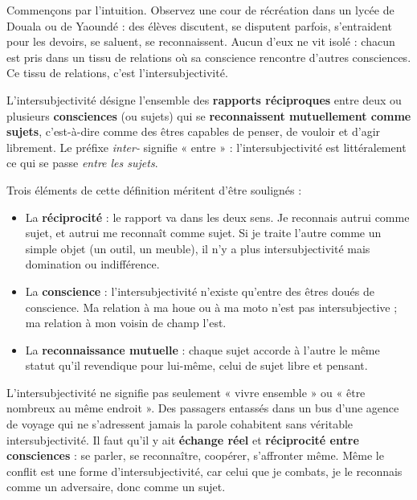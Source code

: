 \documentclass[11pt]{article}
\newcommand{\cle}[1]{{\popxbold\color{popdark}#1}}
\newcounter{popsec}
\newcounter{popsub}
\newcommand{\courssub}[1]{%
  \stepcounter{popsub}%
  \par\vspace{9pt}\noindent{\popxbold\fontsize{11.5}{13}\selectfont\color{popink}{\color{poporange}\thepopsec.\thepopsub}\hspace{6pt}#1}\par\nopagebreak\vspace{4pt}
}
\begin{document}
\courssub{Définition de l'intersubjectivité}

Commençons par l'intuition. Observez une cour de récréation dans un lycée de Douala ou de Yaoundé : des élèves discutent, se disputent parfois, s'entraident pour les devoirs, se saluent, se reconnaissent. Aucun d'eux ne vit isolé : chacun est pris dans un tissu de relations où sa conscience rencontre d'autres consciences. Ce tissu de relations, c'est l'intersubjectivité.

\begin{definition}[L'intersubjectivité]
L'\cle{intersubjectivité} désigne l'ensemble des \textbf{rapports réciproques} entre deux ou plusieurs \textbf{consciences} (ou sujets) qui se \textbf{reconnaissent mutuellement comme sujets}, c'est-à-dire comme des êtres capables de penser, de vouloir et d'agir librement. Le préfixe \emph{inter-} signifie « entre » : l'intersubjectivité est littéralement ce qui se passe \emph{entre les sujets}.
\end{definition}

Trois éléments de cette définition méritent d'être soulignés :

\begin{itemize}
\item La \textbf{réciprocité} : le rapport va dans les deux sens. Je reconnais autrui comme sujet, et autrui me reconnaît comme sujet. Si je traite l'autre comme un simple objet (un outil, un meuble), il n'y a plus intersubjectivité mais domination ou indifférence.
\item La \textbf{conscience} : l'intersubjectivité n'existe qu'entre des êtres doués de conscience. Ma relation à ma houe ou à ma moto n'est pas intersubjective ; ma relation à mon voisin de champ l'est.
\item La \textbf{reconnaissance mutuelle} : chaque sujet accorde à l'autre le même statut qu'il revendique pour lui-même, celui de sujet libre et pensant.
\end{itemize}

\begin{attention}
L'intersubjectivité ne signifie pas seulement « vivre ensemble » ou « être nombreux au même endroit ». Des passagers entassés dans un bus d'une agence de voyage qui ne s'adressent jamais la parole cohabitent sans véritable intersubjectivité. Il faut qu'il y ait \textbf{échange réel} et \textbf{réciprocité entre consciences} : se parler, se reconnaître, coopérer, s'affronter même. Même le conflit est une forme d'intersubjectivité, car celui que je combats, je le reconnais comme un adversaire, donc comme un sujet.
\end{attention}
\end{document}
